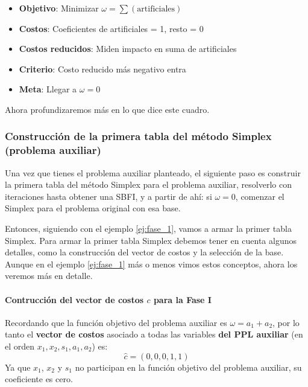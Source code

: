 \begin{tcolorbox}[interesting_data, title=Siempre recordar lo que se busca en la Fase I]
  \begin{itemize}
    \item \textbf{Objetivo}: Minimizar \(\omega = \sum(\text{artificiales})\)
    \item \textbf{Costos}: Coeficientes de artificiales = 1, resto = 0
    \item \textbf{Costos reducidos}: Miden impacto en suma de artificiales
    \item \textbf{Criterio}: Costo reducido más negativo entra
    \item \textbf{Meta}: Llegar a \(\omega = 0\)
  \end{itemize}
\end{tcolorbox}
Ahora profundizaremos más en lo que dice este cuadro. 

\subsubsection{Construcción de la primera tabla del método Simplex (problema auxiliar)}
\label{sec:tabla_simplex}

Una vez que tienes el problema auxiliar planteado, el siguiente paso es construir la primera tabla del método Simplex para el problema auxiliar, resolverlo con iteraciones hasta obtener una SBFI, y a partir de ahí: si \(\omega = 0\), comenzar el Simplex para el problema original con esa base.

Entonces, siguiendo con el ejemplo \ref{ej:fase_1}, vamos a armar la primer tabla Simplex. Para armar la primer tabla Simplex debemos tener en cuenta algunos detalles, como la construcción del vector de costos y la selección de la base. Aunque en el ejemplo \ref{ej:fase_1} más o menos vimos estos conceptos, ahora los veremos más en detalle.

\paragraph{Contrucción del vector de costos \(c\) para la Fase I}

Recordando que la función objetivo del problema auxiliar es \(\omega = a_1 + a_2\), por lo tanto el \textbf{vector de costos} asociado a todas las variables \textbf{del PPL auxiliar} (en el orden \(x_1, x_2, s_1, a_1, a_2\)) es: 
\[
  \hat{c} = (0, 0, 0, 1, 1)
\]
Ya que \(x_1\), \(x_2\) y \(s_1\) no participan en la función objetivo del problema auxiliar, su coeficiente es cero.

